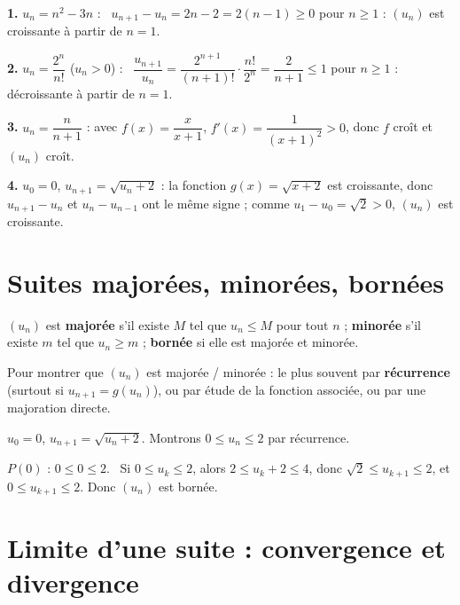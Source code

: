 \begin{exemple}
	\textbf{1.} $u_n=n^{2}-3n$ : \ $u_{n+1}-u_n=2n-2=2(n-1)\geq 0$ pour
	$n\geq 1$ : $(u_n)$ est croissante à partir de $n=1$.

	\textbf{2.} $u_n=\dfrac{2^{n}}{n!}$ ($u_n>0$) : \
	$\dfrac{u_{n+1}}{u_n}=\dfrac{2^{n+1}}{(n+1)!}\cdot\dfrac{n!}{2^{n}}
	=\dfrac{2}{n+1}\leq 1$ pour $n\geq 1$ : décroissante à partir de $n=1$.

	\textbf{3.} $u_n=\dfrac{n}{n+1}$ : avec $f(x)=\dfrac{x}{x+1}$,
	$f'(x)=\dfrac{1}{(x+1)^{2}}>0$, donc $f$ croît et $(u_n)$ croît.

	\textbf{4.} $u_0=0$, $u_{n+1}=\sqrt{u_n+2}$ : la fonction
	$g(x)=\sqrt{x+2}$ est croissante, donc $u_{n+1}-u_n$ et $u_n-u_{n-1}$
	ont le même signe ; comme $u_1-u_0=\sqrt2>0$, $(u_n)$ est croissante.
\end{exemple}


\section{Suites majorées, minorées, bornées}

\begin{definition}
	$(u_n)$ est \textbf{majorée} s'il existe $M$ tel que $u_n\leq M$ pour tout
	$n$ ; \textbf{minorée} s'il existe $m$ tel que $u_n\geq m$ ; \textbf{bornée}
	si elle est majorée et minorée.
\end{definition}

\begin{methode}
	Pour montrer que $(u_n)$ est majorée / minorée : le plus souvent par
	\textbf{récurrence} (surtout si $u_{n+1}=g(u_n)$), ou par étude de la
	fonction associée, ou par une majoration directe.
\end{methode}

\begin{exemple}
	$u_0=0$, $u_{n+1}=\sqrt{u_n+2}$. Montrons $0\leq u_n\leq 2$ par récurrence.

	$P(0)$ : $0\leq 0\leq 2$. \ Si $0\leq u_k\leq 2$, alors
	$2\leq u_k+2\leq 4$, donc $\sqrt 2\leq u_{k+1}\leq 2$, et
	$0\leq u_{k+1}\leq 2$. Donc $(u_n)$ est bornée.
\end{exemple}


\section{Limite d'une suite : convergence et divergence}

